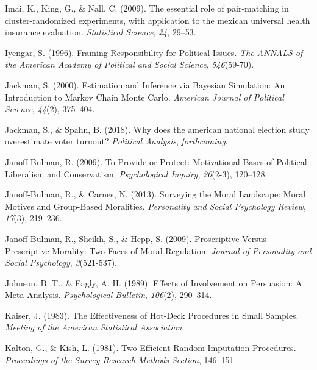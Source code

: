 \documentclass[12pt,econ]{sources/authesis}
\begin{document}
\leavevmode\hypertarget{ref-imai_2009_essential}{}%
Imai, K., King, G., \& Nall, C. (2009). The essential role of pair-matching in cluster-randomized experiments, with application to the mexican universal health insurance evaluation. \emph{Statistical Science}, \emph{24}, 29--53.

\leavevmode\hypertarget{ref-iyengar_framing_1996}{}%
Iyengar, S. (1996). Framing Responsibility for Political Issues. \emph{The ANNALS of the American Academy of Political and Social Science}, \emph{546}(59-70).

\leavevmode\hypertarget{ref-jackman_2000_estimation}{}%
Jackman, S. (2000). Estimation and Inference via Bayesian Simulation: An Introduction to Markov Chain Monte Carlo. \emph{American Journal of Political Science}, \emph{44}(2), 375--404.

\leavevmode\hypertarget{ref-jackman_2018_does}{}%
Jackman, S., \& Spahn, B. (2018). Why does the american national election study overestimate voter turnout? \emph{Political Analysis}, \emph{forthcoming}.

\leavevmode\hypertarget{ref-janoff-bulman_2009_provide}{}%
Janoff-Bulman, R. (2009). To Provide or Protect: Motivational Bases of Political Liberalism and Conservatism. \emph{Psychological Inquiry}, \emph{20}(2-3), 120--128.

\leavevmode\hypertarget{ref-janoff-bulman_2013_surveying}{}%
Janoff-Bulman, R., \& Carnes, N. (2013). Surveying the Moral Landscape: Moral Motives and Group-Based Moralities. \emph{Personality and Social Psychology Review}, \emph{17}(3), 219--236.

\leavevmode\hypertarget{ref-janoff-bulman_2009_proscriptive}{}%
Janoff-Bulman, R., Sheikh, S., \& Hepp, S. (2009). Proscriptive Versus Prescriptive Morality: Two Faces of Moral Regulation. \emph{Journal of Personality and Social Psychology}, \emph{3}(521-537).

\leavevmode\hypertarget{ref-johnson_1989_effects}{}%
Johnson, B. T., \& Eagly, A. H. (1989). Effects of Involvement on Persuasion: A Meta-Analysis. \emph{Psychological Bulletin}, \emph{106}(2), 290--314.

\leavevmode\hypertarget{ref-kaiser_1983_effectiveness}{}%
Kaiser, J. (1983). The Effectiveness of Hot-Deck Procedures in Small Samples. \emph{Meeting of the American Statistical Association}.

\leavevmode\hypertarget{ref-kalton_1981_efficient}{}%
Kalton, G., \& Kish, L. (1981). Two Efficient Random Imputation Procedures. \emph{Proceedings of the Survey Research Methods Section}, 146--151.
\end{document}
